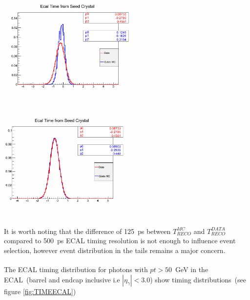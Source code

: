 \begin{center}
\centering
\mbox{
\includegraphics[height=6cm, width=0.5\textwidth]{THESISPLOTS/MC_Vs_DataTimeB4Calib.png}
\includegraphics[height=6cm, width=0.5\textwidth]{THESISPLOTS/MC_Vs_DataTimeAferCalib.png}
}
\label{fig:DATAMCTime}
\end{center}

It is worth noting that the difference of 125~ps between $T^{MC}_{RECO}$ and $T^{DATA}_{RECO}$ compared to 500~ps ECAL timing resolution is not enough to influence event selection, however event distribution in the tails remains a major concern.
\paragraph*{}
The ECAL timing distribution for photons with $pt > 50$~GeV in the ECAL~(barrel and endcap inclusive i.e $|\eta_{\gamma}| < 3.0$) show timing distributions~(see figure \ref{fig:TIMEECAL})

